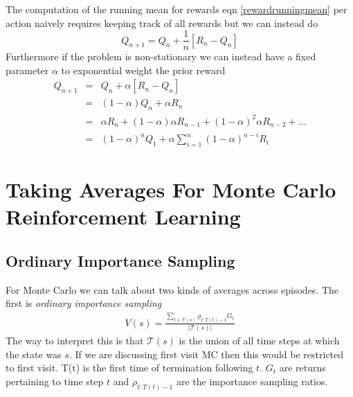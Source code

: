 \documentclass[11pt,a4paper]{article}
\newcommand\be{\begin{equation}}
\newcommand\bea{\begin{eqnarray}}
\newcommand\ee{\end{equation}}
\newcommand\eea{\end{eqnarray}}
\newcommand{\nn}{\nonumber \\}
\begin{document}
The computation of the running mean for rewards eqn \ref{rewardrunningmean} per action naively requires keeping track of all rewards but we can instead do
\be
Q_{n+1} = Q_n + \frac{1}{n} [R_n - Q_n]
\ee
Furthermore if the problem is non-stationary we can instead have a fixed parameter $\alpha$ to exponential weight the prior reward
\bea
Q_{n+1} &=& Q_n + \alpha [R_n - Q_n] \nn
&=& (1-\alpha) Q_n + \alpha R_n \nn
&=& \alpha R_n + (1-\alpha) \alpha R_{n-1} + (1-\alpha)^2 \alpha R_{n-2}  + \dots \nn
&=& (1-\alpha)^n Q_1 + \alpha \sum_{i=1}^n (1-\alpha)^{n-i} R_i
\eea

\section{Taking Averages For Monte Carlo Reinforcement Learning}

\subsection{Ordinary Importance Sampling}

For Monte Carlo we can talk about two kinds of averages across episodes. The first is {\em ordinary importance sampling} 
\bea
V(s) = \frac{\sum_{t \in \mathcal T(s)} \rho_{t:T(t)-1} G_t}{|\mathcal T(s)|}
\eea
The way to interpret this is that $\mathcal T(s)$ is the union of all time steps at which the state was $s$.  If we are discussing first visit MC then this would be restricted to first visit. T(t) is the first time of termination following $t$. $G_t$ are returns pertaining to time step $t$ and $ \rho_{t:T(t)-1}$ are the importance sampling ratios.
\end{document}

